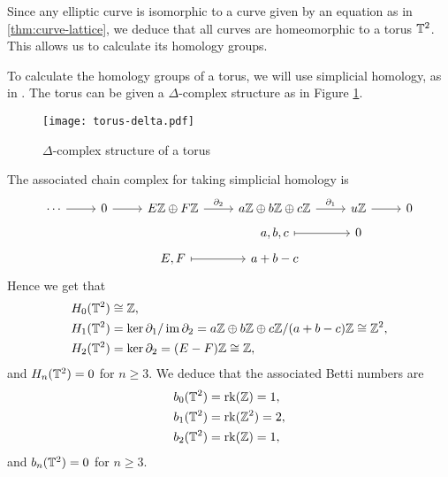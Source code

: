 Since any elliptic curve is isomorphic to a curve given by an equation as in
\ref{thm:curve-lattice}, we deduce that all curves are homeomorphic
to a torus $\mathbb{T}^2$. This allows us to calculate its homology groups.

To calculate the homology groups of a torus, we will use simplicial homology,
as in \cite[\S2.1]{hatcher}. The torus can be given a $\Delta$-complex structure
as in Figure \ref{fig:torus-delta}.
\begin{figure}[h]
	\centering 
	\texttt{[image: torus-delta.pdf]}
	\caption[torus-delta]{$\Delta$-complex structure of a torus}
	\label{fig:torus-delta}
\end{figure}
The associated chain complex for taking simplicial homology is 
\begin{equation*}
	\begin{tikzcd}[row sep=tiny]
	\cdots & 0 & {E\Z \oplus F\Z} & {a\Z\oplus b\Z\oplus c\Z} & u\Z & 0 \\
	&&& {a,b,c} & 0 \\
	&& {E,F} & {a +b-c}
	\arrow["\partial_1", from=1-4, to=1-5]
	\arrow["\partial_2", from=1-3, to=1-4]
	\arrow[from=1-5, to=1-6]
	\arrow[from=1-2, to=1-3]
	\arrow[from=1-1, to=1-2]
	\arrow[maps to, from=3-3, to=3-4]
	\arrow[maps to, from=2-4, to=2-5]
\end{tikzcd}
\end{equation*}
Hence we get that
\begin{align*}
	H_0(\mathbb{T}^2) &\cong \mathbb{Z},\\
	H_1(\mathbb{T}^2) &= \ker \partial_1 / \operatorname{im} \partial_2
	= a\mathbb{Z} \oplus b\mathbb{Z} \oplus c\mathbb{Z} / (a + b - c)\mathbb{Z} \cong \mathbb{Z}^2,\\
	H_2(\mathbb{T}^2) &= \ker \partial_2 = (E-F)\mathbb{Z} \cong \mathbb{Z},
\end{align*}
and $H_n(\mathbb{T}^2) = 0$ for $n \geq 3$.
We deduce that the associated Betti numbers are
\begin{align*}
	b_0(\mathbb{T}^2) &= \operatorname{rk}(\mathbb{Z}) = 1,\\
	b_1(\mathbb{T}^2) &= \operatorname{rk}(\mathbb{Z}^2) = 2,\\
	b_2(\mathbb{T}^2) &= \operatorname{rk}(\mathbb{Z}) = 1,
\end{align*}
and $b_n(\mathbb{T}^2) = 0$ for $n \geq 3$.
